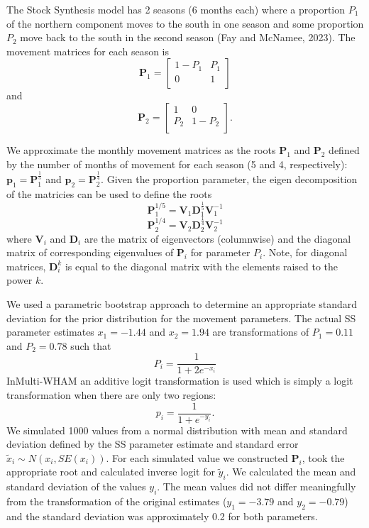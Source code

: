 \documentclass[
]{article}
\begin{document}
The Stock Synthesis model has 2 seasons (6 months each) where a proportion \(P_1\) of the northern component moves to the south in one season and some proportion \(P_2\) move back to the south in the second season (Fay and McNamee, 2023). The movement matrices for each season is
\begin{equation*}
\mathbf{P}_{1} = 
  \begin{bmatrix}
     1-P_1 & P_1 \\
     0 & 1 \\
  \end{bmatrix}
\end{equation*}
and
\begin{equation*}
\mathbf{P}_{2} = 
  \begin{bmatrix}
     1 &  0 \\
     P_2 & 1-P_2 \\
  \end{bmatrix}.
\end{equation*}

We approximate the monthly movement matrices as the roots \(\mathbf{P}_1\) and \(\mathbf{P}_2\) defined by the number of months of movement for each season (5 and 4, respectively): \(\mathbf{p}_1 = \mathbf{P}_1^{\frac{1}{5}}\) and \(\mathbf{p}_2 = \mathbf{P}_2^{\frac{1}{4}}\). Given the proportion parameter, the eigen decomposition of the matricies can be used to define the roots
\[  \mathbf{P}_1^{1/5} = \mathbf{V}_1 \mathbf{D}_1^{\frac{1}{5}} \mathbf{V}_1^{-1}\]
\[  \mathbf{P}_2^{1/4} = \mathbf{V}_2 \mathbf{D}_2^{\frac{1}{4}} \mathbf{V}_2^{-1}\]
where \(\mathbf{V}_i\) and \(\mathbf{D}_i\) are the matrix of eigenvectors (columnwise) and the diagonal matrix of corresponding eigenvalues of \(\mathbf{P}_i\) for parameter \(P_i\). Note, for diagonal matrices, \(\mathbf{D}_i^k\) is equal to the diagonal matrix with the elements raised to the power \(k\).

We used a parametric bootstrap approach to determine an appropriate standard deviation for the prior distribution for the movement parameters.
The actual SS parameter estimates \(x_1=-1.44\) and \(x_2=1.94\) are transformations of \(P_1=0.11\) and \(P_2=0.78\) such that
\[
P_i = \frac{1}{1 + 2e^{-x_i}}
\]
InMulti-WHAM an additive logit transformation is used which is simply a logit transformation when there are only two regions:
\[
p_i = \frac{1}{1+e^{-y_i}}.
\]
We simulated 1000 values from a normal distribution with mean and standard deviation defined by the SS parameter estimate and standard error \(\tilde x_i \sim N(x_i, SE(x_i))\). For each simulated value we constructed \(\mathbf{P}_i\), took the appropriate root and calculated inverse logit for \(\tilde y_i\). We calculated the mean and standard deviation of the values \(y_i\). The mean values did not differ meaningfully from the transformation of the original estimates (\(y_1 = -3.79\) and \(y_2 = -0.79\)) and the standard deviation was approximately 0.2 for both parameters.
\end{document}
